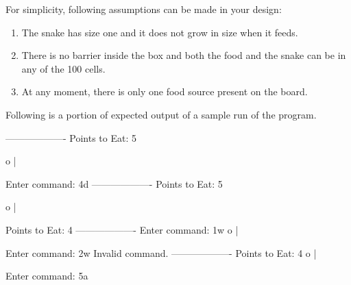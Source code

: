 \documentclass[12pt,letterpaper,twoside]{article}
\begin{document}
For simplicity, following assumptions can be made in your design:
\begin{enumerate}[itemsep=0mm,rightmargin=\leftmargin]
  \item The snake has size one and it does not grow in size when it feeds.
  \item There is no barrier inside the box and both the food and the snake can be in any of the 100 cells.
  \item At any moment, there is only one food source present on the board.
\end{enumerate}

Following is a portion of expected output of a sample run of the program.

\begin{terminal}
-------------------
Points to Eat: 5

       o
   |


Enter command: 4d
-------------------
Points to Eat: 5

       o
       |


Points to Eat: 4
-------------------
Enter command: 1w
  o
       |



Enter command: 2w
Invalid command.
-------------------
Points to Eat: 4
  o
       |



Enter command: 5a
\end{terminal}

\end{document}
